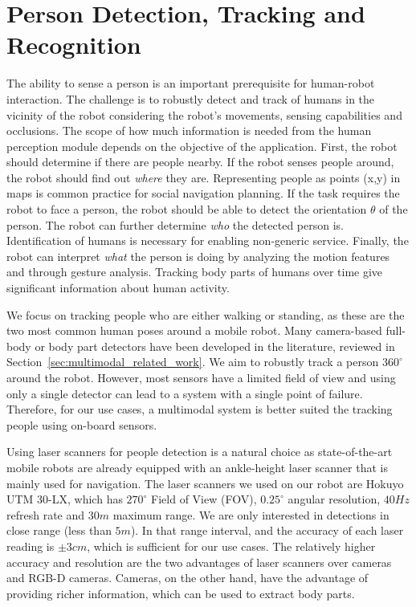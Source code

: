 \chapter{Person Detection, Tracking and Recognition}
\label{chapter:multimodal_person_detection_and_tracking}
The ability to sense a person is an important prerequisite for human-robot interaction. The challenge is to robustly detect and track of humans in the vicinity of the robot considering the robot's movements, sensing capabilities and occlusions. The scope of how much information is needed from the human perception module depends on the objective of the application. First, the robot should determine if there are people nearby. If the robot senses people around, the robot should find out \emph{where} they are. Representing people as points (x,y) in maps is common practice for social navigation planning. If the task requires the robot to face a person, the robot should be able to detect the orientation $\theta$ of the person. The robot can further determine \emph{who} the detected person is. Identification of humans is necessary for enabling non-generic service. Finally, the robot can interpret \emph{what} the person is doing by analyzing the motion features and through gesture analysis. Tracking body parts of humans over time give significant information about human activity.

We focus on tracking people who are either walking or standing, as these are the two most common human poses around a mobile robot. Many camera-based full-body or body part detectors have been developed in the literature, reviewed in Section~\ref{sec:multimodal_related_work}. We aim to robustly track a person $360^{\circ}$ around the robot. However, most sensors have a limited field of view and using only a single detector can lead to a system with a single point of failure. Therefore, for our use cases, a multimodal system is better suited the tracking people using on-board sensors. 

Using laser scanners for people detection is a natural choice as state-of-the-art mobile robots are already equipped with an ankle-height laser scanner that is mainly used for navigation. The laser scanners we used on our robot are Hokuyo UTM 30-LX, which has $270^{\circ}$ Field of View (FOV), $0.25^{\circ}$ angular resolution, $40Hz$ refresh rate and $30m$ maximum range. We are only interested in detections in close range (less than $5m$). In that range interval, and the accuracy of each laser reading is $\pm 3cm$, which is sufficient for our use cases. The relatively higher accuracy and resolution are the two advantages of laser scanners over cameras and RGB-D cameras. Cameras, on the other hand, have the advantage of providing richer information, which can be used to extract body parts. 

